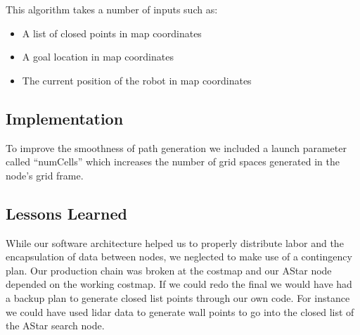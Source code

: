  This algorithm takes a number
of inputs such as:
\begin{itemize}
\item
  A list of closed points in map coordinates
\item
  A goal location in map coordinates
\item
  The current position of the robot in map coordinates
\end{itemize}


\subsection{Implementation}
To improve the smoothness of path generation we included a launch parameter called ``numCells'' which increases the number of grid spaces generated in the node's grid frame. 


\subsection{Lessons Learned}
While our software architecture helped us to properly distribute labor and the encapsulation of data between nodes,
we neglected to make use of a contingency plan. Our production chain was broken at the costmap and our AStar node depended
on the working costmap. If we could redo the final we would have had a backup plan to generate closed list points
through our own code. For instance we could have used lidar data to generate wall points to go into the closed list of the AStar search node.
